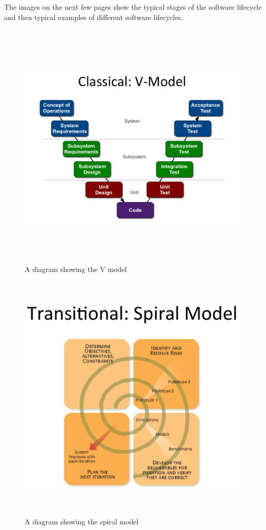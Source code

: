 \documentclass[a4paper]{report}
\begin{document}
The images on the next few pages show the typical stages of the software lifecycle and then typical examples of different software lifecycles.

\begin{figure}[h]
\begin{center} 
    \includegraphics[scale=0.6,width = 15cm, height = 12cm]{images/VModel.pdf}
    \caption{A diagram showing the V model}
\end{center}
\end{figure}

\begin{figure}[h]
\begin{center} 
    \includegraphics[scale=0.8,width = 15cm, height = 12cm]{images/Spiral.pdf}
    \caption{A diagram showing the spiral model}
\end{center}
\end{figure}
\end{document}
